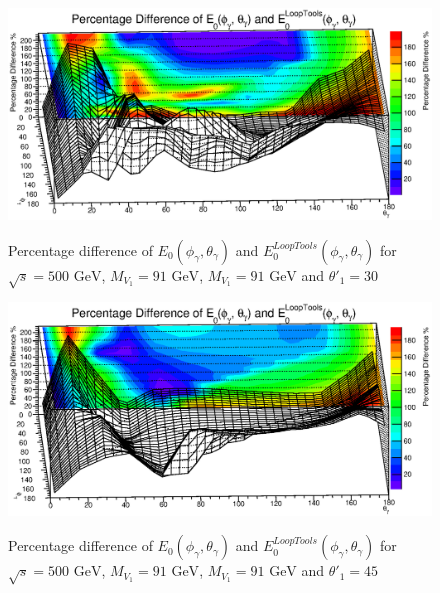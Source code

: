 \begin{figure}
	\begin{center}
		\includegraphics[scale=0.55]{30PD3.eps}\\
	\caption{ Percentage difference of $E_0(\phi_\gamma,\theta_\gamma)$ and $E_0^{LoopTools}(\phi_\gamma,\theta_\gamma)$ for $\sqrt{s}=500\text{ GeV}$, $M_{V_1}=91\text{ GeV}$, $M_{V_1}=91\text{ GeV}$ and $\theta'_1=30$ }
	\end{center}
\end{figure}

\begin{figure}
	\begin{center}
		\includegraphics[scale=0.55]{45PD3.eps}\\
	\caption{ Percentage difference of $E_0(\phi_\gamma,\theta_\gamma)$ and $E_0^{LoopTools}(\phi_\gamma,\theta_\gamma)$ for $\sqrt{s}=500\text{ GeV}$, $M_{V_1}=91\text{ GeV}$, $M_{V_1}=91\text{ GeV}$ and $\theta'_1=45$ }
	\end{center}
\end{figure}

